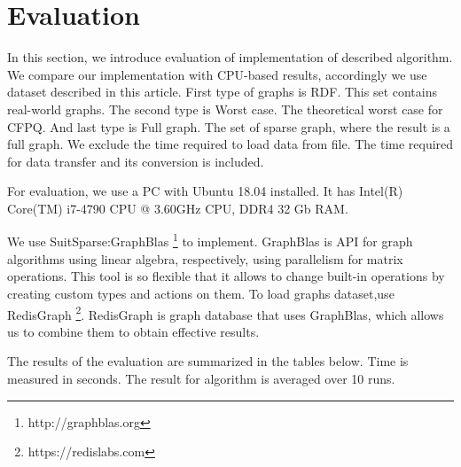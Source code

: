 \section{Evaluation}


In this section, we introduce evaluation of implementation of described algorithm. We compare our implementation with \cite{10.1145/3327964.3328503} CPU-based results, accordingly we use dataset described in this article. First type of graphs is RDF. This set contains real-world graphs. The second type is Worst case. The theoretical worst case for CFPQ. And last type is Full graph. The set of sparse graph, where the result is a full graph. We exclude the time required to load data from file. The time required for data transfer and its conversion is included.

For evaluation, we use a PC with Ubuntu 18.04 installed. It has Intel(R) Core(TM) i7-4790 CPU @ 3.60GHz CPU, DDR4 32 Gb RAM.

We use SuitSparse:GraphBlas \footnote{http://graphblas.org} to implement. GraphBlas is API for graph algorithms using linear algebra, respectively, using parallelism for matrix operations. This tool is so flexible that it allows to change built-in operations by creating custom types and actions on them. To load graphs dataset,use RedisGraph \footnote{https://redislabs.com}. RedisGraph is graph database that uses GraphBlas, which allows us to combine them to obtain effective results.

The results of the evaluation are summarized in the tables below.
Time is measured in seconds. The result for algorithm is averaged over 10 runs.

